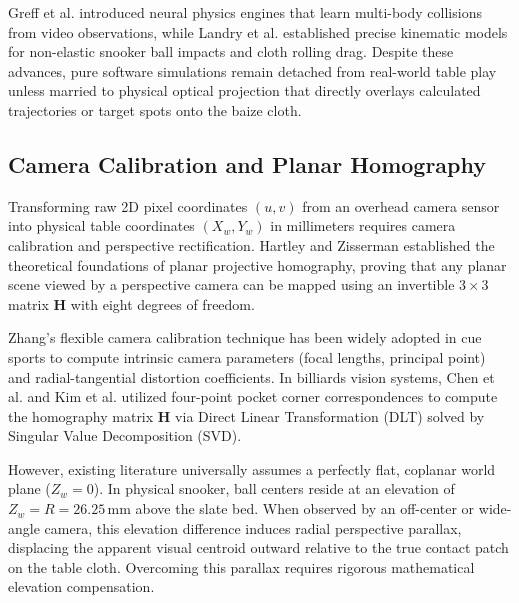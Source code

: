 Greff et al. \cite{ref20} introduced neural physics engines that learn multi-body collisions from video observations, while Landry et al. \cite{ref27} established precise kinematic models for non-elastic snooker ball impacts and cloth rolling drag. Despite these advances, pure software simulations remain detached from real-world table play unless married to physical optical projection that directly overlays calculated trajectories or target spots onto the baize cloth.

\subsection{Camera Calibration and Planar Homography}
Transforming raw 2D pixel coordinates $(u, v)$ from an overhead camera sensor into physical table coordinates $(X_w, Y_w)$ in millimeters requires camera calibration and perspective rectification. Hartley and Zisserman \cite{ref19} established the theoretical foundations of planar projective homography, proving that any planar scene viewed by a perspective camera can be mapped using an invertible $3 \times 3$ matrix $\mathbf{H}$ with eight degrees of freedom.

Zhang's flexible camera calibration technique \cite{ref35} has been widely adopted in cue sports \cite{ref13, ref15} to compute intrinsic camera parameters (focal lengths, principal point) and radial-tangential distortion coefficients. In billiards vision systems, Chen et al. \cite{ref7} and Kim et al. \cite{ref13} utilized four-point pocket corner correspondences to compute the homography matrix $\mathbf{H}$ via Direct Linear Transformation (DLT) solved by Singular Value Decomposition (SVD). 

However, existing literature universally assumes a perfectly flat, coplanar world plane ($Z_w = 0$). In physical snooker, ball centers reside at an elevation of $Z_w = R = 26.25\,\text{mm}$ above the slate bed. When observed by an off-center or wide-angle camera, this elevation difference induces radial perspective parallax, displacing the apparent visual centroid outward relative to the true contact patch on the table cloth. Overcoming this parallax requires rigorous mathematical elevation compensation.

